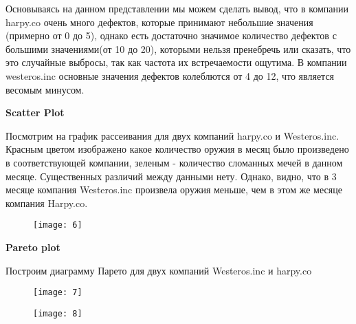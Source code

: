 \documentclass{beamer}
\begin{document}
\begin{frame}
Основываясь на данном представлении мы можем сделать вывод, что в компании harpy.co очень много дефектов, которые принимают небольшие значения (примерно от 0 до 5), однако есть достаточно значимое количество дефектов с большими значениями(от 10 до 20), которыми нельзя пренебречь или сказать, что это случайные выбросы, так как частота их встречаемости ощутима. В компании westeros.inc основные значения дефектов колеблются от 4 до 12, что является весомым минусом.
\end{frame}

\begin{frame}
\textbf{Scatter Plot}

Посмотрим на график рассеивания для двух компаний harpy.co и Westeros.inc. Красным цветом изображено какое количество оружия в месяц было произведено в соответствующей компании, зеленым - количество сломанных мечей в данном месяце. Существенных различий между данными нету. Однако, видно, что в 3 месяце компания Westeros.inc произвела оружия меньше, чем в этом же месяце компания Harpy.co.
\end{frame}

\begin{frame}
\begin{figure}[t]
\centering
\texttt{[image: 6]}
\end{figure}
\end{frame}

\begin{frame}
\textbf{Pareto plot}


Построим диаграмму Парето для двух компаний Westeros.inc и harpy.co
\begin{figure}[t]
\centering
\texttt{[image: 7]}
\end{figure}
\end{frame}

\begin{frame}
\begin{figure}[t]
	\centering
	\texttt{[image: 8]}
\end{figure}
\end{frame}
\end{document}
